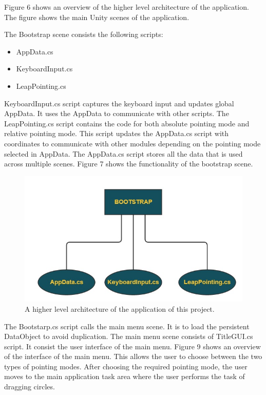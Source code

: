 \documentclass{article}
\begin{document}
Figure 6 shows an overview of the higher level architecture of the application. The figure shows the main Unity scenes of the application.

The Bootstrap scene consists the following scripts:

\begin{itemize}
    \item AppData.cs
    \item KeyboardInput.cs
    \item LeapPointing.cs
\end{itemize}

KeyboardInput.cs script captures the keyboard input and updates global AppData. It uses the AppData to communicate with other scripts. The LeapPointing.cs script contains the code for both absolute pointing mode and relative pointing mode. This script updates the AppData.cs script with coordinates to communicate with other modules depending on the pointing mode selected in AppData. The AppData.cs script stores all the data that is used across multiple scenes. Figure 7 shows the functionality of the bootstrap scene.

\begin{figure}[!h]
\centering
\includegraphics[width=4.5in]{Figure_7}
\caption{A higher level architecture of the application of this project.}
\end{figure}


The Bootstarp.cs script calls the main menu scene. It is to load the persistent DataObject to avoid duplication. The main menu scene consists of TitleGUI.cs script. It consist the user interface of the main menu. Figure 9 shows an overview of the interface of the main menu. This allows the user to choose between the two types of pointing modes. After choosing the required pointing mode, the user moves to the main application task area where the user performs the task of dragging circles.
\end{document}
